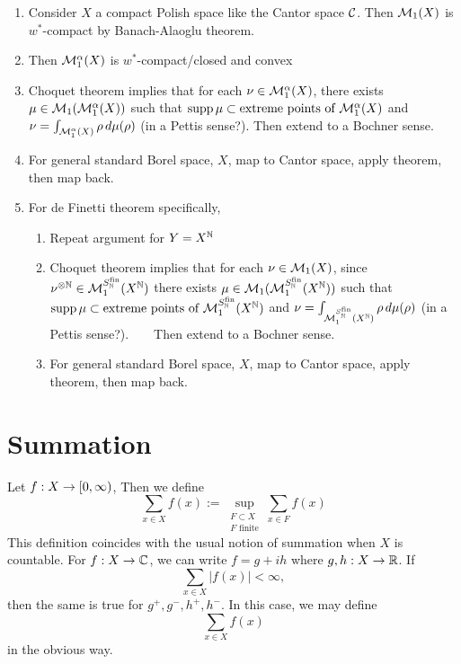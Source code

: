 \documentclass{book}
\begin{document}
	
	
	\begin{enumerate}
		\item  Consider $X$ a compact Polish space like the Cantor space $\mathcal{C}$. Then $\mathcal{M}_1(X)$ is $w^*$-compact by Banach-Alaoglu theorem.
		\item Then $\mathcal{M}_1^{\alpha}(X)$ is $w^*$-compact/closed and convex
		\item Choquet theorem implies that for each $\nu \in \mathcal{M}_1^{\alpha}(X)$, there exists $\mu \in \mathcal{M}_1(\mathcal{M}_1^{\alpha}(X))$ such that $\operatorname{supp} \mu \subset \text{extreme points of $\mathcal{M}_1^{\alpha}(X)$}$ and $\nu = \int_{\mathcal{M}_1^{\alpha}(X)} \rho \, d \mu(\rho)$ (in a Pettis sense?). Then extend to a Bochner sense. 
		\item For general standard Borel space, $X$, map to Cantor space, apply theorem, then map back. 
		\item For de Finetti theorem specifically, 
		\begin{enumerate}
			\item Repeat argument for $Y = X^{\mathbb{N}}$ ~\cite{hewitt1955symmetric}
			\item Choquet theorem implies that for each $\nu \in \mathcal{M}_1(X)$, since $\nu^{\otimes \mathbb{N}} \in \mathcal{M}_1^{S^{\text{fin}}_{\mathbb{N}}}(X^{\mathbb{N}})$ there exists $\mu \in \mathcal{M}_1(\mathcal{M}_1^{S^{\text{fin}}_{\mathbb{N}}}(X^{\mathbb{N}}))$ such that $\operatorname{supp} \mu \subset \text{extreme points of $\mathcal{M}_1^{S^{\text{fin}}_{\mathbb{N}}}(X^{\mathbb{N}})$}$ and $\nu = \int_{\mathcal{M}_1^{S^{\text{fin}}_{\mathbb{N}}}(X^{\mathbb{N}})} \rho \, d \mu(\rho)$ (in a Pettis sense?). ~\cite{phelps2002lectures} ~\cite{stefansson1992pettis} Then extend to a Bochner sense. 
			\item For general standard Borel space, $X$, map to Cantor space, apply theorem, then map back. 
		\end{enumerate}
		
		
		
	\end{enumerate}

	
	


	\backmatter
	
	\appendix
	
	
	\chapter{Summation}
	
	\begin{defn}  
		Let $f:X \rightarrow [0,\infty)$, Then we define $$\sum\limits_{x \in X} f(x) := \sup\limits_{\substack{F \subset X \\ F \text{ finite}}} \sum\limits_{x \in F} f(x)$$ This definition coincides with the usual notion of summation when $X$ is countable. For $f:X \rightarrow \mathbb{C}$, we can write $f = g +ih$ where $g,h:X \rightarrow \mathbb{R}$. If $$\sum\limits_{x \in X}|f(x)| < \infty,$$ then the same is true for $g^+,g^-,h^+,h^-$. In this case, we may define $$\sum\limits_{x \in X} f(x)$$ in the obvious way.
	\end{defn} 
	
\end{document}
